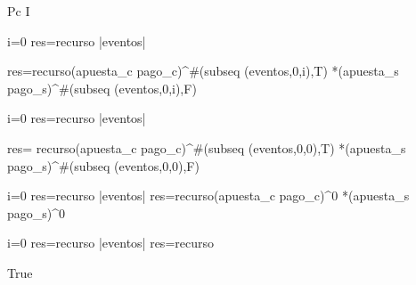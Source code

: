 \begin{itemize}
    { \item Pc \longrightarrow I}
\end{itemize}

\equiv i=0 \wedge res=recurso  \leq |eventos|\yLuego

res=recurso(apuesta_c pago_c)^{\#(subseq (eventos,0,i),T)} *(apuesta_s pago_s)^{\#(subseq (eventos,0,i),F)} 
\vspace{0.3cm}

\equiv i=0 \wedge res=recurso  \leq |eventos| \yLuego 

res= recurso(apuesta_c pago_c)^{\#(subseq (eventos,0,0),T)} *(apuesta_s pago_s)^{\#(subseq (eventos,0,0),F)}
\vspace{0.3cm}

\equiv i=0 \wedge res=recurso  \leq |eventos| \yLuego res=recurso(apuesta_c pago_c)^{0} *(apuesta_s pago_s)^{0}
\vspace{0.3cm}

\equiv  i=0 \wedge res=recurso  \leq |eventos| \yLuego res=recurso 
\vspace{0.3cm}


\equiv True

